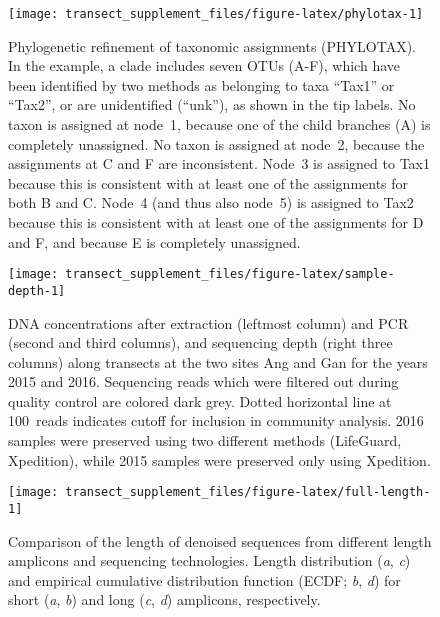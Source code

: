 \documentclass[
]{article}
\begin{document}
\begin{figure}

{\centering \texttt{[image: transect\_supplement\_files/figure-latex/phylotax-1]} 

}

\caption[Phylogenetic refinement of taxonomic assignments (PHYLOTAX)]{Phylogenetic refinement of taxonomic assignments (PHYLOTAX). In the example, a clade includes seven OTUs (A-F), which have been identified by two methods as belonging to taxa ``Tax1'' or ``Tax2'', or are unidentified (``unk''), as shown in the tip labels.
No taxon is assigned at node~1, because one of the child branches (A) is completely unassigned.
No taxon is assigned at node~2, because the assignments at C and F are inconsistent.
Node~3 is assigned to Tax1 because this is consistent with at least one of the assignments for both B and C.
Node~4 (and thus also node~5) is assigned to Tax2 because this is consistent with at least one of the assignments for D and F, and because E is completely unassigned.}\label{fig:phylotax}
\end{figure}








\begin{figure}

{\centering \texttt{[image: transect\_supplement\_files/figure-latex/sample-depth-1]} 

}

\caption[DNA concentrations after extraction and PCR, and sequencing depth along transects at the two sites Ang and Gan for the years 2015 and 2016]{DNA concentrations after extraction (leftmost column) and PCR (second and third columns), and sequencing depth (right three columns) along transects at the two sites Ang and Gan for the years 2015 and 2016.
Sequencing reads which were filtered out during quality control are colored dark grey.
Dotted horizontal line at 100~reads indicates cutoff for inclusion in community analysis.
2016 samples were preserved using two different methods (LifeGuard, Xpedition), while 2015 samples were preserved only using Xpedition.}\label{fig:sample-depth}
\end{figure}





\begin{figure}

{\centering \texttt{[image: transect\_supplement\_files/figure-latex/full-length-1]} 

}

\caption[Comparison of the length of denoised sequences from different length amplicons and sequencing technologies]{Comparison of the length of denoised sequences from different length amplicons and sequencing technologies. Length distribution (\emph{a}, \emph{c}) and empirical cumulative distribution function (ECDF; \emph{b}, \emph{d}) for short (\emph{a}, \emph{b}) and long (\emph{c}, \emph{d}) amplicons, respectively.}\label{fig:full-length}
\end{figure}
\end{document}
